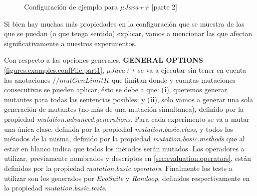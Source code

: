 \begin{figure}
	
	\caption{Configuraci\'on de ejemplo para \emph{$\mu$Java++} [parte 2]}
	\label{figures.examples.confFile.part2}
\end{figure}

Si bien hay muchas m\'as propiedades en la configuraci\'on que se muestra de las que se puedan (o que tenga sentido) explicar, vamos a mencionar las que afectan significativamente a nuestros experimentos.

Con respecto a las opciones generales, \textbf{GENERAL OPTIONS} \ref{figures.examples.confFile.part1}, \emph{$\mu$Java++} se va a ejecutar sin tener en cuenta las anotaciones $//mutGenLimit K$ que limitan donde y cuantas mutaciones consecutivas se pueden aplicar, \'esto se debe a que: (\textbf{i}), queremos generar mutantes para todas las sentencias posibles; y (\textbf{ii}), solo vamos a generar una sola generaci\'on de mutantes (no m\'as de una mutaci\'on simultanea), definido por la propiedad \emph{mutation.advanced.generations}. Para cada experimento se va a mutar una \'unica clase, definida por la propiedad \emph{mutation.basic.class}, y todos los m\'etodos de la misma, definido por la propiedad \emph{mutation.basic.methods} que al estar en blanco indica que todos los m\'etodos ser\'an mutados. Los operadores a utilizar, previamente nombrados y descriptos en \ref{sec:evaluation.operators}, est\'an definidos por la propiedad \emph{mutation.basic.operators}. Finalmente los tests a utilizar son los generados por \emph{EvoSuite} y \emph{Randoop}, definidos respectivamente en la propiedad \emph{mutation.basic.tests}.

